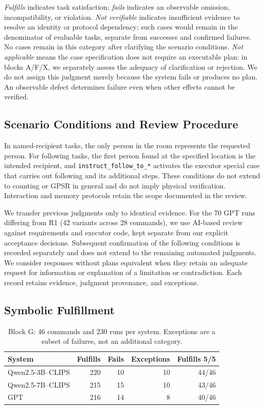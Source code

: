 \documentclass[a4paper,twoside]{article}
\begin{document}
\emph{Fulfills} indicates task satisfaction; \emph{fails} indicates an observable omission, incompatibility, or violation. \emph{Not verifiable} indicates insufficient evidence to resolve an identity or protocol dependency; such cases would remain in the denominator of evaluable tasks, separate from successes and confirmed failures. No cases remain in this category after clarifying the scenario conditions. \emph{Not applicable} means the case specification does not require an executable plan: in blocks A/F/X, we separately assess the adequacy of clarification or rejection. We do not assign this judgment merely because the system fails or produces no plan. An observable defect determines failure even when other effects cannot be verified.

\subsection{Scenario Conditions and Review Procedure}
In named-recipient tasks, the only person in the room represents the requested person. For following tasks, the first person found at the specified location is the intended recipient, and \texttt{instruct\_follow\_to\_*} activates the executor special case that carries out following and its additional steps. These conditions do not extend to counting or GPSR in general and do not imply physical verification. Interaction and memory protocols retain the scope documented in the review.

We transfer previous judgments only to identical evidence. For the 70 GPT runs differing from R1 (42 variants across 28 commands), we use AI-based review against requirements and executor code, kept separate from our explicit acceptance decisions. Subsequent confirmation of the following conditions is recorded separately and does not extend to the remaining automated judgments. We consider responses without plans equivalent when they retain an adequate request for information or explanation of a limitation or contradiction. Each record retains evidence, judgment provenance, and exceptions.

\subsection{Symbolic Fulfillment}

\begin{table}[t]
\centering\small
\caption{Block G: 46 commands and 230 runs per system. Exceptions are a subset of failures, not an additional category.}
\label{tab:resultados_g}
\begin{tabular}{@{}lrrrr@{}}
\toprule
System & Fulfills & Fails & Exceptions & Fulfills 5/5 \\
\midrule
Qwen2.5-3B--CLIPS & 220 & 10 & 10 & 44/46 \\
Qwen2.5-7B--CLIPS & 215 & 15 & 10 & 43/46 \\
GPT & 216 & 14 & 8 & 40/46 \\
\bottomrule
\end{tabular}
\end{table}
\end{document}

